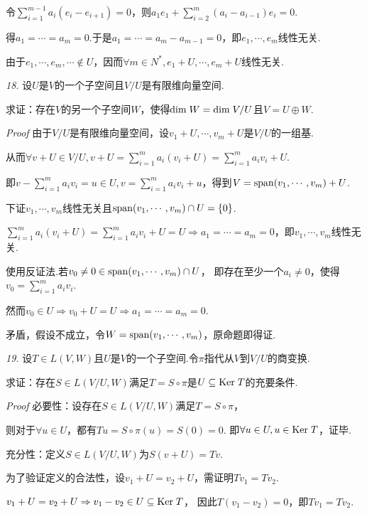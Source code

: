 令\(\sum_{i=1}^{m-1} a_i(e_i-e_{i+1})=0\)，则\(a_1e_1+\sum_{i=2}^m(a_i-a_{i-1})e_i=0\).

得\(a_1=\cdots=a_m=0\).于是\(a_1=\cdots=a_m-a_{m-1}=0\)，即\(e_1,\cdots,e_m\)线性无关.

由于\(e_1,\cdots,e_m,\cdots \notin U\)，因而\(\forall m \in N^*,e_1+U,\cdots,e_m+U\)线性无关.

\newpage

\textit{18.}
设\(U\)是\(V\)的一个子空间且\(V/U\)是有限维向量空间.

求证：存在\(V\)的另一个子空间\(W\)，使得\(\mathrm{dim \;} W=\mathrm{dim \;} V/U\)且\(V=U \oplus W\).

\textit{Proof}
由于\(V/U\)是有限维向量空间，设\(v_1+U,\cdots,v_m+U\)是\(V/U\)的一组基.

从而\(\forall v+U \in V/U,v+U=\sum_{i=1}^m a_i(v_i+U)=\sum_{i=1}^m a_iv_i+U\).

即\(v-\sum_{i=1}^m a_iv_i=u \in U,v=\sum_{i=1}^m a_iv_i+u\)，得到\(V=\mathrm{span} (v_1,\cdots,v_m)+U\).

下证\(v_1,\cdots,v_m\)线性无关且\(\mathrm{span} (v_1,\cdots,v_m) \cap U =\{0\}\).

\(\sum_{i=1}^m a_i(v_i+U)=\sum_{i=1}^m a_iv_i+U=U \Rightarrow a_1=\cdots=a_m=0\)，即\(v_1,\cdots,v_m\)线性无关.

使用反证法.若\(v_0 \ne 0 \in \mathrm{span} (v_1,\cdots,v_m) \cap U\)，
即存在至少一个\(a_i \ne 0\)，使得\(v_0=\sum_{i=1}^m a_iv_i\).

然而\(v_0 \in U \Rightarrow v_0+U=U \Rightarrow a_1=\cdots=a_m=0\).

矛盾，假设不成立，令\(W=\mathrm{span} (v_1,\cdots,v_m)\)，原命题即得证.

\hspace*{\fill}

\textit{19.}
设\(T \in L(V,W)\)且\(U\)是\(V\)的一个子空间.令\(\pi\)指代从\(V\)到\(V/U\)的商变换.

求证：存在\(S \in L(V/U,W)\)满足\(T=S \circ \pi\)是\(U \subseteq \mathrm{Ker \;} T\)的充要条件.

\textit{Proof}
必要性：设存在\(S \in L(V/U,W)\)满足\(T=S \circ \pi\)，

则对于\(\forall u \in U\)，都有\(Tu=S \circ \pi(u)=S(0)=0\).
即\(\forall u \in U,u \in \mathrm{Ker \;} T\)，证毕.

充分性：定义\(S \in L(V/U,W)\)为\(S(v+U)=Tv\).

为了验证定义的合法性，设\(v_1+U=v_2+U\)，需证明\(Tv_1=Tv_2\).

\(v_1+U=v_2+U \Rightarrow v_1-v_2 \in U \subseteq \mathrm{Ker \;} T\)，
因此\(T(v_1-v_2)=0\)，即\(Tv_1=Tv_2\).

